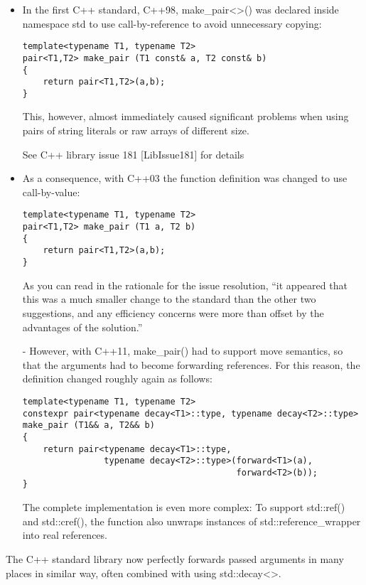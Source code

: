 \begin{itemize}
\item
In the first C++ standard, C++98, make\_pair<>() was declared inside namespace std to use call-by-reference to avoid unnecessary copying:

\begin{lstlisting}[style=styleCXX]
template<typename T1, typename T2>
pair<T1,T2> make_pair (T1 const& a, T2 const& b)
{
	return pair<T1,T2>(a,b);
}
\end{lstlisting}

This, however, almost immediately caused significant problems when using pairs of string literals or raw arrays of different size.

\begin{tcolorbox}[colback=webgreen!5!white,colframe=webgreen!75!black]
\hspace*{0.75cm}See C++ library issue 181 [LibIssue181] for details
\end{tcolorbox}

\item
As a consequence, with C++03 the function definition was changed to use call-by-value:

\begin{lstlisting}[style=styleCXX]
template<typename T1, typename T2>
pair<T1,T2> make_pair (T1 a, T2 b)
{
	return pair<T1,T2>(a,b);
}
\end{lstlisting}

As you can read in the rationale for the issue resolution, “it appeared that this was a much smaller change to the standard than the other two suggestions, and any efficiency concerns were more than offset by the advantages of the solution.”

\item[-]
However, with C++11, make\_pair() had to support move semantics, so that the arguments had to become forwarding references. For this reason, the definition changed roughly again as follows:

\begin{lstlisting}[style=styleCXX]
template<typename T1, typename T2>
constexpr pair<typename decay<T1>::type, typename decay<T2>::type>
make_pair (T1&& a, T2&& b)
{
	return pair<typename decay<T1>::type,
				typename decay<T2>::type>(forward<T1>(a),
										  forward<T2>(b));
}
\end{lstlisting}

The complete implementation is even more complex: To support std::ref() and std::cref(), the function also unwraps instances of std::reference\_wrapper into real references.
\end{itemize}

The C++ standard library now perfectly forwards passed arguments in many places in similar way, often combined with using std::decay<>.


















